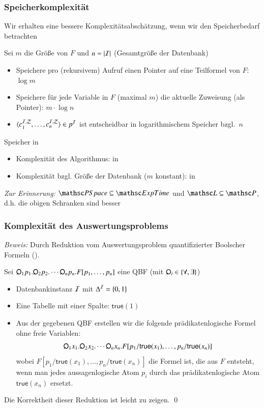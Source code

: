 \documentclass[onlymath]{beamer}
\begin{document}
\begin{frame}\frametitle{Speicherkomplexität}

Wir erhalten eine bessere Komplexitätsabschätzung, wenn wir den Speicherbedarf
betrachten
\bigskip

Sei $m$ die Größe von $F$ und $n=|\mathcal{I}|$ (Gesamtgröße der Datenbank)
\bigskip

\begin{itemize}
\item Speichere pro (rekursivem) Aufruf einen Pointer auf eine Teilformel von $F$: $\log m$
\item Speichere für jede Variable in $F$ (maximal $m$) die aktuelle Zuweisung (als Pointer): $m\cdot\log n$
\item $\langle{c_1^{\mathcal{I},\mathcal{Z}},\ldots,c_n^{\mathcal{I},\mathcal{Z}}}\rangle\in p^{\mathcal{I}}$ ist entscheidbar in logarithmischem Speicher bzgl.\ $n$
\end{itemize}
\bigskip\pause

Speicher in 
\begin{itemize}
\item Komplexität des Algorithmus: in \PSpace
\item Komplexität bzgl. Größe der Datenbank ($m$ konstant): in \LogSpace
\end{itemize}

{\tiny\emph{Zur Erinnerung:} $\PSpace\subseteq\ExpTime$ und $\LogSpace\subseteq\PTime$, d.h. die obigen Schranken sind besser}

\end{frame}

\begin{frame}\frametitle{Komplexität des Auswertungsproblems}

\pause

\emph{Beweis:} Durch Reduktion vom Auswertungsproblem quantifizierter Boolscher Formeln ().\medskip

Sei $\quantor_1 p_1. \quantor_2 p_2. \cdots \quantor_n p_n.F[p_1,\ldots,p_n]$ eine QBF (mit $\quantor_i\in\{\forall,\exists\}$)\pause
\begin{itemize}
\item Datenbankinstanz $\mathcal{I}$ mit $\Delta^{\mathcal{I}}=\{0,1\}$
\item Eine Tabelle mit einer Spalte: $\textsf{true}(1)$
\item Aus der gegebenen QBF erstellen wir die folgende prädikatenlogische Formel ohne freie Variablen:
\[\quantor_1 x_1. \quantor_2 x_2. \cdots \quantor_n x_n.F[p_1/\textsf{true}(x_1),\ldots,p_n/\textsf{true}(x_n)]\]
wobei $F[p_1/\textsf{true}(x_1),\ldots,p_n/\textsf{true}(x_n)]$ die Formel ist, die aus $F$ entsteht, wenn man jedes aussagenlogische Atom $p_i$ durch das prädikatenlogische Atom
$\textsf{true}(x_n)$ ersetzt.
\end{itemize}
Die Korrektheit dieser Reduktion ist leicht zu zeigen. \qed

\end{frame}
\end{document}
